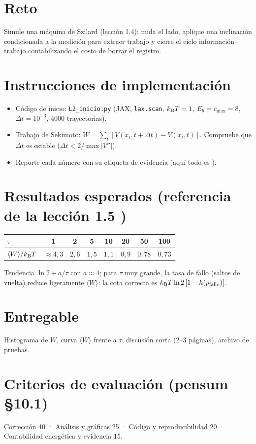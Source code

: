 \documentclass[11pt,a4paper]{article}
\begin{document}
\section*{Reto}
Simule una máquina de Szilard (lección 1.4): mida el lado, aplique una inclinación condicionada a la medición para
extraer trabajo y cierre el ciclo información--trabajo contabilizando el costo de borrar el registro.

\section*{Instrucciones de implementación}
\begin{itemize}[nosep]
\item Código de inicio: \texttt{L2\_inicio.py} (JAX, \texttt{lax.scan}, $k_{\mathrm B} T=1$, $E_b=c_{\max}=8$, $\Delta t=10^{-3}$, 4000 trayectorias).
\item Trabajo de Sekimoto: $W=\sum_t[V(x_t,t+\Delta t)-V(x_t,t)]$. Compruebe que $\Delta t$ es estable ($\Delta t<2/\max|V''|$).
\item Reporte cada número con su etiqueta de evidencia (aquí todo es \evS).
\end{itemize}

\section*{Resultados esperados (referencia de la lección 1.5 \evS)}
\begin{center}
\begin{tabular}{lccccccc}\toprule
$\tau$ & 1 & 2 & 5 & 10 & 20 & 50 & 100\\\midrule
$\langle W\rangle/k_{\mathrm B} T$ & $\approx4{,}3$ & $2{,}6$ & $1{,}5$ & $1{,}1$ & $0{,}9$ & $0{,}78$ & $0{,}73$\\\bottomrule
\end{tabular}
\end{center}
Tendencia $\ln2+a/\tau$ con $a\approx4$; para $\tau$ muy grande, la tasa de fallo (saltos de vuelta) reduce
ligeramente $\langle W\rangle$: la cota correcta es $k_{\mathrm B} T\ln2\,[1-h(p_{\text{fallo}})]$.

\section*{Entregable}
Histograma de $W$, curva $\langle W\rangle$ frente a $\tau$, discusión corta (2--3 páginas), archivo de pruebas.

\section*{Criterios de evaluación (pensum §10.1)}
Corrección 40 · Análisis y gráficas 25 · Código y reproducibilidad 20 · Contabilidad energética y evidencia 15.
\end{document}
